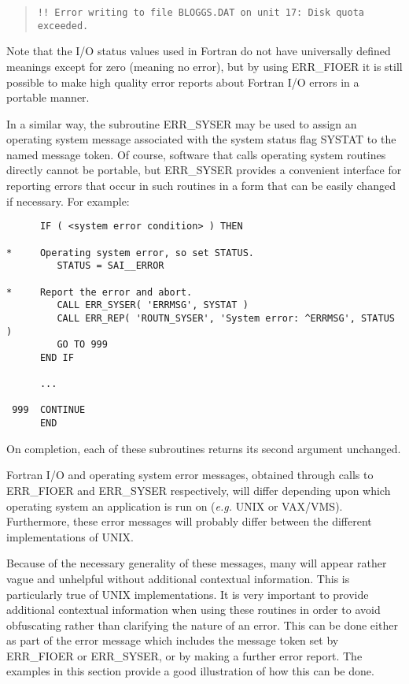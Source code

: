 \begin {quote}
\begin {small}
\begin{verbatim}
!! Error writing to file BLOGGS.DAT on unit 17: Disk quota exceeded.
\end{verbatim}
\end {small}
\end {quote}

Note that the I/O status values used in Fortran do not have universally
defined meanings except for zero (meaning no error), but by using
ERR\_FIOER it is still possible to make high quality error reports about
Fortran I/O errors in a portable manner. 

In a similar way, the subroutine ERR\_SYSER may be used to assign an 
operating system message associated with the 
system status flag SYSTAT to the named message token.
Of course, software that calls operating system routines directly cannot be
portable, but ERR\_SYSER provides a convenient interface for reporting 
errors that occur in such routines in a form that can be easily changed if 
necessary.
For example:

\begin {small}
\begin{verbatim}
      IF ( <system error condition> ) THEN

*     Operating system error, so set STATUS.
         STATUS = SAI__ERROR

*     Report the error and abort.
         CALL ERR_SYSER( 'ERRMSG', SYSTAT )
         CALL ERR_REP( 'ROUTN_SYSER', 'System error: ^ERRMSG', STATUS )
         GO TO 999
      END IF

      ...

 999  CONTINUE
      END
\end{verbatim}
\end {small}

On completion, each of these subroutines returns its second argument
unchanged. 

Fortran I/O and operating system error messages, obtained through calls to 
ERR\_FIOER and ERR\_SYSER respectively, will differ depending upon which 
operating system an application is run on ({\em e.g.} UNIX or VAX/VMS).
Furthermore, these error messages will probably differ between the different 
implementations of UNIX.

Because of the necessary generality of these messages, many will appear rather
vague and unhelpful without additional contextual information.
This is particularly true of UNIX implementations.
It is very important to provide additional contextual information when using
these routines in order to avoid obfuscating rather than clarifying the nature 
of an error.
This can be done either as part of the error message which includes the message
token set by ERR\_FIOER or ERR\_SYSER, or by making a further error report.
The examples in this section provide a good illustration of how this can 
be done.



